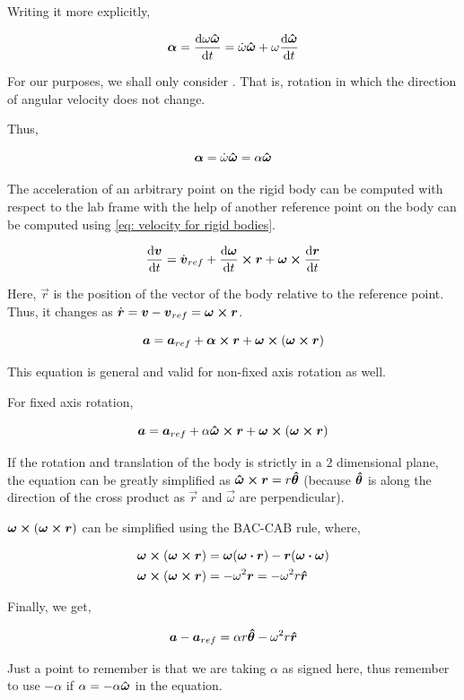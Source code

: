 Writing it more explicitly, 

\[\boldsymbol{\alpha} = \dv{\omega{{\boldsymbol{\hat{\omega}}}}}{t} = \dot{\omega}{{\boldsymbol{\hat{\omega}}}} + \omega\dv{{{\boldsymbol{\hat{\omega}}}}}{t}\]

For our purposes, we shall only consider . That is, rotation 
in which the direction of angular velocity does not change. 

Thus, 

\[\boldsymbol{\alpha} = \dot{\omega}{{\boldsymbol{\hat{\omega}}}} = \alpha{{\boldsymbol{\hat{\omega}}}}\]

The acceleration of an arbitrary point on the rigid body can be computed 
with respect to the lab frame with the help of another reference point on the 
body can be computed using \cref{eq: velocity for rigid bodies}.

\begin{equation*}
    \dv{\vv}{t} = \ndiv{\vv}_{ref} + \dv{\vec{\omega}}{t} \cp \vec{r} + \vec{\omega} \cp \dv{\vec{r}}{t} 
\end{equation*}

Here, \(\vec{r}\) is the position of the vector of the body relative to the reference point. 
Thus, it changes as \(\ndiv{\vec{r}} = \vv - \vv_{ref} = \vec{\omega} \cp \vec{r}\).

\begin{equation}
    \vec{a} = \vec{a}_{ref} + \vec{\alpha} \cp \vec{r} + \vec{\omega} \cp  (\vec{\omega} \cp \vec{r})
\end{equation}

This equation is general and valid for non-fixed axis rotation as well. 

For fixed axis rotation,

\begin{equation}
    \vec{a} = \vec{a}_{ref} + \alpha\unitv{\omega} \cp \vec{r} + \vec{\omega} \cp  (\vec{\omega} \cp \vec{r})
\end{equation}

If the rotation and translation of the body is strictly in a \(2\) dimensional plane,
the equation can be greatly simplified as \(\unitv{\omega} \cp \vec{r} = r\unitv{\theta}\)
(because \({{\boldsymbol{\hat{\theta}}}}\) is along the direction of the cross product as \(\vec{r}\) and 
\(\vec{\omega}\) are perpendicular). 

\(\vec{\omega} \cp  (\vec{\omega} \cp \vec{r})\) can be simplified using the 
BAC-CAB rule, where, 

\begin{align*}
    \vec{\omega} \cp  (\vec{\omega} \cp \vec{r}) &= \vec{\omega}(\vec{\omega} \dtp \vec{r}) - \vec{r}(\vec{\omega} \dtp \vec{\omega}) \\
    \vec{\omega} \cp  (\vec{\omega} \cp \vec{r}) &= -\omega^2\vec{r} = -\omega^2r\unitv{r}
\end{align*}

Finally, we get, 

\begin{equation}
    \boldsymbol{a} - \boldsymbol{a}_{ref} = \alpha r {{\boldsymbol{\hat{\theta}}}} -\omega^2r{{\boldsymbol{\hat{r}}}}
\end{equation}

Just a point to remember is that we are taking \(\alpha\) as signed here, 
thus remember to use \(-\alpha\) if \(\alpha = -\alpha{{\boldsymbol{\hat{\omega}}}}\) in the equation.

